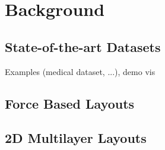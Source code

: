 \chapter{Background}

\section{State-of-the-art Datasets}

Examples (medical dataset, ...), demo vis \\


\section{Force Based Layouts}

\section{2D Multilayer Layouts}

